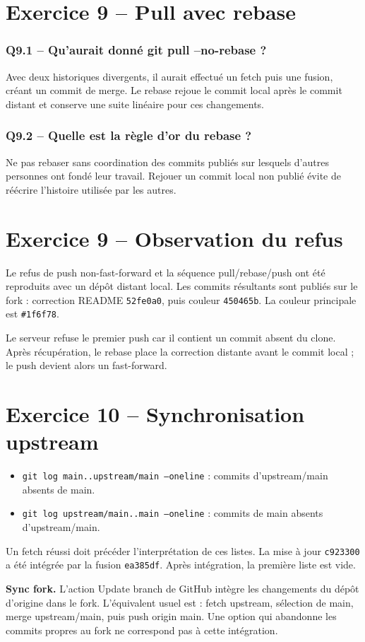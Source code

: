 \documentclass[10pt,a4paper]{article}
\newcommand{\question}[1]{\subsubsection*{#1}}
\begin{document}
\section*{Exercice 9 -- Pull avec rebase}
\question{Q9.1 -- Qu'aurait donné git pull --no-rebase ?}
Avec deux historiques divergents, il aurait effectué un fetch puis une fusion, créant un commit de merge. Le rebase rejoue le commit local après le commit distant et conserve une suite linéaire pour ces changements.

\question{Q9.2 -- Quelle est la règle d'or du rebase ?}
Ne pas rebaser sans coordination des commits publiés sur lesquels d'autres personnes ont fondé leur travail. Rejouer un commit local non publié évite de réécrire l'histoire utilisée par les autres.

\newpage
\section*{Exercice 9 -- Observation du refus}
Le refus de push non-fast-forward et la séquence pull/rebase/push ont été reproduits avec un dépôt distant local. Les commits résultants sont publiés sur le fork : correction README \texttt{52fe0a0}, puis couleur \texttt{450465b}. La couleur principale est \texttt{\#1f6f78}.

Le serveur refuse le premier push car il contient un commit absent du clone. Après récupération, le rebase place la correction distante avant le commit local ; le push devient alors un fast-forward.

\section*{Exercice 10 -- Synchronisation upstream}
\begin{itemize}
\item \texttt{git log main..upstream/main --oneline} : commits d'upstream/main absents de main.
\item \texttt{git log upstream/main..main --oneline} : commits de main absents d'upstream/main.
\end{itemize}

Un fetch réussi doit précéder l'interprétation de ces listes. La mise à jour \texttt{c923300} a été intégrée par la fusion \texttt{ea385df}. Après intégration, la première liste est vide.

\textbf{Sync fork.} L'action Update branch de GitHub intègre les changements du dépôt d'origine dans le fork. L'équivalent usuel est : fetch upstream, sélection de main, merge upstream/main, puis push origin main. Une option qui abandonne les commits propres au fork ne correspond pas à cette intégration.
\end{document}
